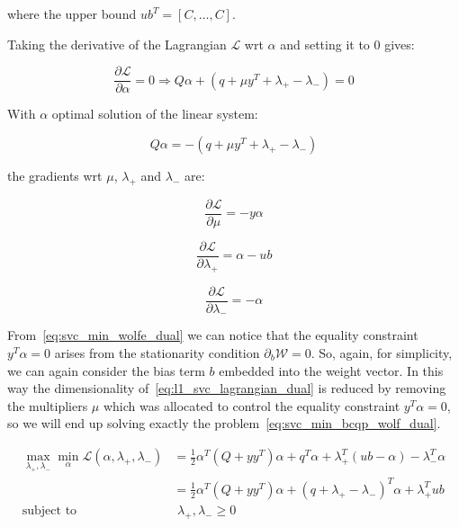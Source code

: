where the upper bound $ub^T = [C, \dots, C]$.

Taking the derivative of the Lagrangian $\mathcal{L}$ wrt $\alpha$ and setting it to 0 gives:

\begin{equation} \label{eq:svc_lagrangian_der_a}
	\frac{\partial \mathcal{L}}{\partial \alpha}=0\Rightarrow Q \alpha + (q + \mu y^T + \lambda_+ - \lambda_-) = 0
\end{equation}

With $\alpha$ optimal solution of the linear system:

\begin{equation} \label{eq:l1_svc_lagrangian_sol}
    Q \alpha = - (q + \mu y^T + \lambda_+ - \lambda_-)
\end{equation}

the gradients wrt $\mu$, $\lambda_+$ and $\lambda_-$ are:

\begin{equation} \label{eq:svc_lagrangian_der_mu}
	\frac{\partial \mathcal{L}}{\partial \mu}=-y \alpha
\end{equation}

\begin{equation} \label{eq:svc_lagrangian_der_lp}
	\frac{\partial \mathcal{L}}{\partial \lambda_+}=\alpha - ub
\end{equation}

\begin{equation} \label{eq:svc_lagrangian_der_lm}
    \frac{\partial \mathcal{L}}{\partial \lambda_-}=-\alpha
\end{equation}

From~\eqref{eq:svc_min_wolfe_dual} we can notice that the equality constraint $y^T \alpha = 0$ arises from the stationarity condition $\partial_{{b}} \mathcal{W}=0$. So, again, for simplicity, we can again consider the bias term $b$ embedded into the weight vector. In this way the dimensionality of~\eqref{eq:l1_svc_lagrangian_dual} is reduced by removing the multipliers $\mu$ which was allocated to control the equality constraint $y^T \alpha=0$, so we will end up solving exactly the problem~\eqref{eq:svc_min_bcqp_wolf_dual}.

\begin{equation} \label{eq:l1_svc_bcqp_lagrangian_dual}
	\begin{aligned}
    	\max_{\lambda_+,\lambda_-} \min_{\alpha} \mathcal{L}(\alpha,\lambda_+,\lambda_-) &= \frac{1}{2} \alpha^T (Q + yy^T)\alpha+q^T\alpha + \lambda_+^T (ub - \alpha) - \lambda_-^T \alpha \\
    &= \frac{1}{2} \alpha^T (Q + yy^T)\alpha + (q + \lambda_+ - \lambda_-)^T \alpha + \lambda_+^T ub \\
    \text{subject to} \quad & \,\, \lambda_+, \lambda_- \geq 0
	\end{aligned}
\end{equation}

